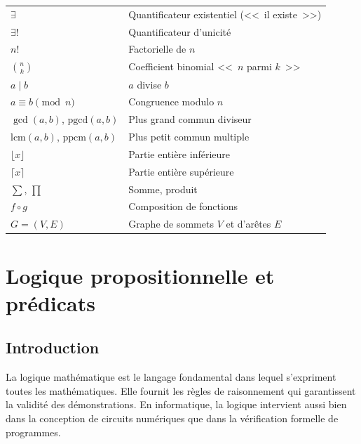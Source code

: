 \documentclass[12pt,a4paper,openany]{book}
\theoremstyle{definition}
\theoremstyle{plain}
\theoremstyle{remark}
\begin{document}
\begin{longtable}{@{} >{\raggedright\arraybackslash}p{4cm} p{9cm} @{}}
$\exists$ & Quantificateur existentiel (<<~il existe~>>) \\[4pt]
$\exists!$ & Quantificateur d'unicit\'e \\[4pt]
$n!$ & Factorielle de $n$ \\[4pt]
$\binom{n}{k}$ & Coefficient binomial <<~$n$ parmi $k$~>> \\[4pt]
$a \mid b$ & $a$ divise $b$ \\[4pt]
$a \equiv b \pmod{n}$ & Congruence modulo $n$ \\[4pt]
$\gcd(a,b)$, $\text{pgcd}(a,b)$ & Plus grand commun diviseur \\[4pt]
$\text{lcm}(a,b)$, $\text{ppcm}(a,b)$ & Plus petit commun multiple \\[4pt]
$\lfloor x \rfloor$ & Partie enti\`ere inf\'erieure \\[4pt]
$\lceil x \rceil$ & Partie enti\`ere sup\'erieure \\[4pt]
$\sum$, $\prod$ & Somme, produit \\[4pt]
$f \circ g$ & Composition de fonctions \\[4pt]
$G = (V,E)$ & Graphe de sommets $V$ et d'ar\^etes $E$ \\
\bottomrule
\end{longtable}

\tableofcontents

\chapter{Logique propositionnelle et pr\'edicats}
\label{ch:logique}

\section*{Introduction}

La logique math\'ematique est le langage fondamental dans lequel s'expriment toutes les math\'ematiques. Elle fournit les r\`egles de raisonnement qui garantissent la validit\'e des d\'emonstrations. En informatique, la logique intervient aussi bien dans la conception de circuits num\'eriques que dans la v\'erification formelle de programmes.
\end{document}
